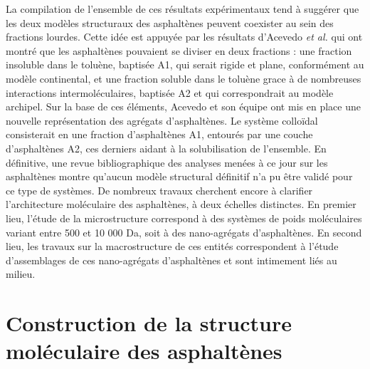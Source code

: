 	La compilation de l'ensemble de ces résultats expérimentaux tend à suggérer que les deux modèles structuraux des asphaltènes peuvent coexister au sein des fractions lourdes. Cette idée est appuyée par les résultats d'Acevedo \textit{et al.} \cite{acevedo2004structural, gutierrez2001fractionation} qui ont montré que les asphaltènes pouvaient se diviser en deux fractions : une fraction insoluble dans le toluène, baptisée A1, qui serait rigide et plane, conformément au modèle continental, et une fraction soluble dans le toluène grace à de nombreuses interactions intermoléculaires, baptisée A2 et qui correspondrait au modèle archipel. Sur la base de ces éléments, Acevedo et son équipe ont mis en place une nouvelle représentation des agrégats d'asphaltènes. Le système colloïdal consisterait en une fraction d'asphaltènes A1, entourés par une couche d'asphaltènes A2, ces derniers aidant à la solubilisation de l'ensemble. 
	En définitive, une revue bibliographique des analyses menées à ce jour sur les asphaltènes montre qu'aucun modèle structural définitif n'a pu être validé pour ce type de systèmes. De nombreux travaux cherchent encore à clarifier l'architecture moléculaire des asphaltènes, à deux échelles distinctes. En premier lieu, l'étude de la microstructure correspond à des systèmes de poids moléculaires variant entre 500 et 10 000 Da, soit à des nano-agrégats d'asphaltènes. En second lieu, les travaux sur la macrostructure de ces entités correspondent à l'étude d'assemblages de ces nano-agrégats d'asphaltènes et sont intimement liés au milieu. 
	
	\bigskip
	
	\singlespacing
	\section{Construction de la structure moléculaire des asphaltènes}
	
